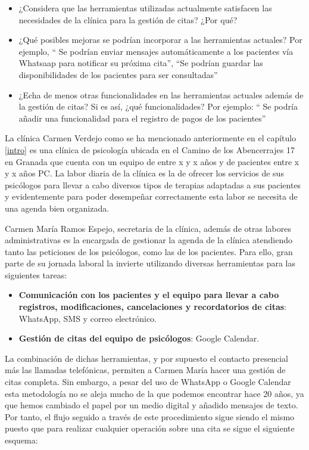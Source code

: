 \begin{itemize}
    \item ¿Considera que las herramientas utilizadas actualmente satisfacen las necesidades de la clínica para la gestión de citas? ¿Por qué?
    \item¿Qué posibles mejoras se podrían incorporar a las herramientas actuales? Por ejemplo, “ Se podrían enviar mensajes automáticamente a los pacientes vía Whatsaap para notificar su próxima cita”, “Se podrían guardar las disponibilidades de los pacientes para ser consultadas”
    \item¿Echa de menos otras funcionalidades en las herramientas actuales además de la gestión de citas? Si es así, ¿qué funcionalidades? Por ejemplo: “ Se podría añadir una funcionalidad para el registro de pagos de los pacientes”
\end{itemize}

La clínica Carmen Verdejo como se ha mencionado anteriormente en el capítulo \ref{intro} es una clínica de psicología ubicada en el Camino de los Abencerrajes 17 en Granada que cuenta con un equipo de entre x y x años y de pacientes entre x y x años PC. La labor diaria de la clínica es la de ofrecer los servicios de sus psicólogos para llevar a cabo diversos tipos de terapias adaptadas a sus pacientes y evidentemente para poder desempeñar correctamente esta labor se necesita de una agenda bien organizada.\bigskip

Carmen María Ramos Espejo, secretaria de la clínica, además de otras labores administrativas es la encargada de gestionar la agenda de la clínica atendiendo tanto las peticiones de los psicólogos, como las de los pacientes. Para ello, gran parte de su jornada laboral la invierte utilizando diversas herramientas para las siguientes tareas:

\begin{itemize}
    \item \textbf{Comunicación con los pacientes y el equipo para llevar a cabo registros, modificaciones, cancelaciones y recordatorios de citas}: WhatsApp, SMS y correo electrónico.
    \item \textbf{Gestión de citas del equipo de psicólogos}: Google Calendar.
\end{itemize}

La combinación de dichas herramientas, y por supuesto el contacto presencial más las llamadas telefónicas, permiten a Carmen María hacer una gestión de citas completa. Sin embargo, a pesar del uso de WhatsApp o Google Calendar esta metodología no se aleja mucho de la que podemos encontrar hace 20 años, ya que hemos cambiado el papel por un medio digital y añadido mensajes de texto. Por tanto, el flujo seguido a través de este procedimiento sigue siendo el mismo puesto que para realizar cualquier operación sobre una cita se sigue el siguiente esquema:

